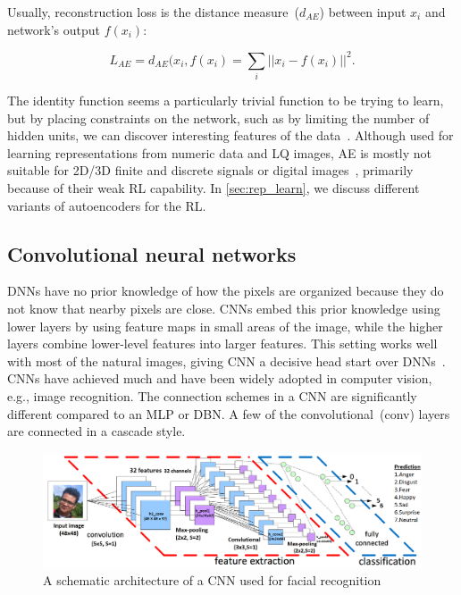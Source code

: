 Usually, reconstruction loss is the distance measure~($d_{AE}$) between input $x_i$ and network's output $f(x_i)$: 

\vspace{-2mm}
\begin{equation}
    L_{AE}=\text{$d_{AE}$}(x_i, f(x_i) = \sum_{i} ||x_{i}-f(x_i)||^{2}.
    \label{eq:Loss1}
\end{equation}

\hspace*{3.5mm} The identity function seems a particularly trivial function to be trying to learn, but by placing constraints on the network, such as by limiting the number of hidden units, we can discover interesting features of the data~\cite{karimDLTF2018}. Although used for learning representations from numeric data and LQ images, AE is mostly not suitable for 2D/3D finite and discrete signals or digital images~\cite{min2018survey}, primarily because of their weak RL capability. In \cref{sec:rep_learn}, we discuss different variants of autoencoders for the RL. %

\subsection{Convolutional neural networks}
DNNs have no prior knowledge of how the pixels are organized because they do not know that nearby pixels are close. CNNs embed this prior knowledge using lower layers by using feature maps in small areas of the image, while the higher layers combine lower-level features into larger features. This setting works well with most of the natural images, giving CNN a decisive head start over DNNs~\cite{karimIoT2019}. CNNs have achieved much and have been widely adopted in computer vision, e.g., image recognition. The connection schemes in a CNN are significantly different compared to an MLP or DBN. A few of the convolutional~(conv) layers are connected in a cascade style. 

\begin{figure}[h]
    \centering
    \includegraphics[scale=0.6]{images/cnn.png}
    \caption{A schematic architecture of a CNN used for facial recognition~\cite{karim2017predictive,zaccone2018deep}}
    \label{fig:cnn_theory1}
\end{figure}

